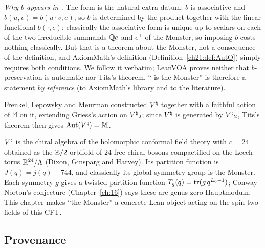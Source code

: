 \emph{Why $b$ appears in .}  The form is the natural extra datum: $b$ is associative and
$b(u,v)=b(u\cdot v,e)$, so $b$ is determined by the product together with the linear functional
$b(\cdot,e)$; classically the associative form is unique up to scalars on each of the two irreducible
summands ${\mathbb{Q}} e$ and $e^\perp$ of the Monster, so imposing $b$ costs nothing classically.  But that is a
theorem about the Monster, not a consequence of the definition, and AxiomMath's definition
(Definition~\ref{ch21:def:AutO}) simply requires both conditions.  We follow it verbatim; LeanVOA proves
neither that $b$-preservation is automatic nor Tits's theorem.  `` is the Monster'' is
therefore a statement \emph{by reference} (to AxiomMath's library and to the literature).

Frenkel, Lepowsky and Meurman constructed ${V^{\natural}}$ together with a faithful action of $\mathbb M$ on it,
extending Griess's action on ${V^{\natural}}_2$; since ${V^{\natural}}$ is generated by ${V^{\natural}}_2$, Tits's theorem then gives
$\operatorname{Aut}({V^{\natural}})=\mathbb M$.

\begin{physics}
${V^{\natural}}$ is the chiral algebra of the holomorphic conformal field theory with $c=24$ obtained as the
${\mathbb{Z}}/2$-orbifold of $24$ free chiral bosons compactified on the Leech torus $\mathbb{R}^{24}/{\Lambda}$ (Dixon,
Ginsparg and Harvey).  Its partition function is $J(q)=j(q)-744$, and classically its global symmetry
group is the Monster.  Each symmetry $g$ gives a twisted partition function $T_g(q)=\operatorname{tr}(g\,q^{L_0-1})$;
Conway--Norton's conjecture (Chapter~\ref{ch:16}) says these are genus-zero Hauptmoduln.  This chapter
makes ``the Monster'' a concrete Lean object acting on the spin-two fields of this CFT.
\end{physics}

\subsection{Provenance}\label{ch21:sec:provenance}

